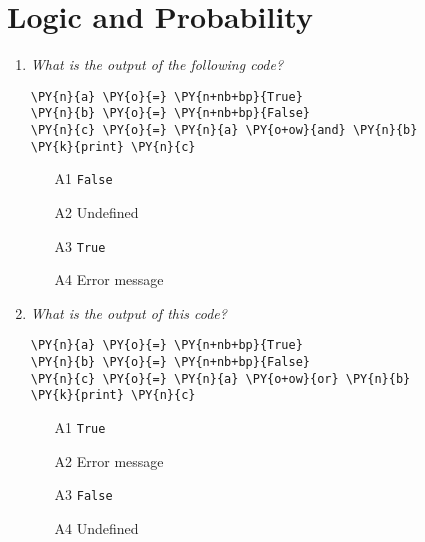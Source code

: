 
\section{Logic and Probability}

\begin{enumerate}

\item {\em What is the output of the following code?}\\

\begin{Verbatim}[commandchars=\\\{\}]
\PY{n}{a} \PY{o}{=} \PY{n+nb+bp}{True}
\PY{n}{b} \PY{o}{=} \PY{n+nb+bp}{False}
\PY{n}{c} \PY{o}{=} \PY{n}{a} \PY{o+ow}{and} \PY{n}{b}
\PY{k}{print} \PY{n}{c}
\end{Verbatim}
\vspace{6mm}

\begin{enumerate}
\item[A1] {\tt False}
\item[A2] Undefined
\item[A3] {\tt True}
\item[A4] Error message
\end{enumerate}

\vspace{6mm}

\item {\em What is the output of this code?}\\

\begin{Verbatim}[commandchars=\\\{\}]
\PY{n}{a} \PY{o}{=} \PY{n+nb+bp}{True}
\PY{n}{b} \PY{o}{=} \PY{n+nb+bp}{False}
\PY{n}{c} \PY{o}{=} \PY{n}{a} \PY{o+ow}{or} \PY{n}{b}
\PY{k}{print} \PY{n}{c}
\end{Verbatim}
\vspace{6mm}

\begin{enumerate}
\item[A1] {\tt True}
\item[A2] Error message
\item[A3] {\tt False}
\item[A4] Undefined
\end{enumerate}

\vspace{6mm}


\end{enumerate}
